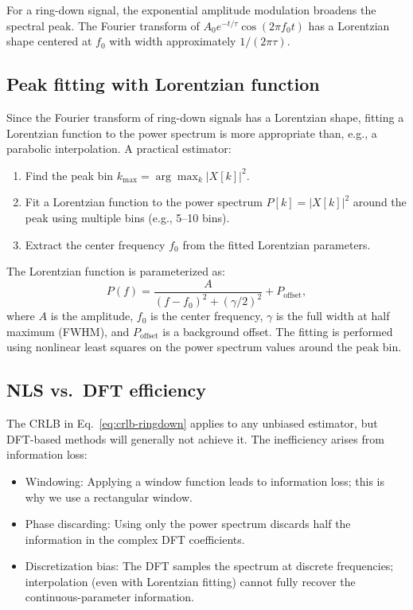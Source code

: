 \documentclass[11pt]{article}
\begin{document}
For a ring-down signal, the exponential amplitude modulation broadens the spectral peak. The Fourier transform of $A_0 e^{-t/\tau}\cos(2\pi f_0 t)$ has a Lorentzian shape centered at $f_0$ with width approximately $1/(2\pi\tau)$.

\subsection{Peak fitting with Lorentzian function}

Since the Fourier transform of ring-down signals has a Lorentzian shape, fitting a Lorentzian function to the power spectrum is more appropriate than, e.g., a parabolic interpolation. A practical estimator:

\begin{enumerate}
\item Find the peak bin $k_{\max} = \arg\max_k |X[k]|^2$.
\item Fit a Lorentzian function to the power spectrum $P[k] = |X[k]|^2$ around the peak using multiple bins (e.g., 5--10 bins).
\item Extract the center frequency $f_0$ from the fitted Lorentzian parameters.
\end{enumerate}

The Lorentzian function is parameterized as:
\begin{equation}
P(f) = \frac{A}{(f - f_0)^2 + (\gamma/2)^2} + P_{\text{offset}},
\end{equation}
where $A$ is the amplitude, $f_0$ is the center frequency, $\gamma$ is the full width at half maximum (FWHM), and $P_{\text{offset}}$ is a background offset. The fitting is performed using nonlinear least squares on the power spectrum values around the peak bin.

\subsection{NLS vs.\ DFT efficiency}
\label{sec:dft-efficiency}

The CRLB in Eq.~\eqref{eq:crlb-ringdown} applies to any unbiased estimator, but DFT-based methods will generally not achieve it. The inefficiency arises from information loss:
 
\begin{itemize} 
\item {Windowing}: Applying a window function leads to information loss; this is why we use a rectangular window.
\item {Phase discarding}: Using only the power spectrum discards half the information in the complex DFT coefficients. 
\item {Discretization bias}: The DFT samples the spectrum at discrete frequencies; interpolation (even with Lorentzian fitting) cannot fully recover the continuous-parameter information. 
\end{itemize} 
\end{document}
